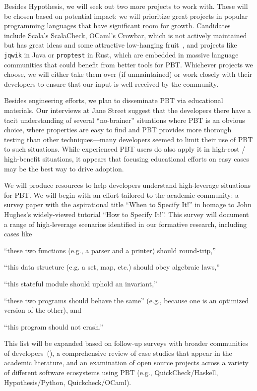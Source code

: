 Besides Hypothesis, we will seek out two more projects to work with. These
will be chosen based on potential impact: we will prioritize great
projects in popular programming languages that have significant room
for growth. Candidates include
Scala's ScalaCheck,
OCaml's Crowbar, which is not actively maintained but has great ideas and
some attractive low-hanging fruit~\cite{noauthor_shrinking_nodate}, and projects like
\lstinline{jqwik} in Java or \lstinline{proptest} in Rust, which are
embedded in massive language
communities that could benefit from better tools for PBT. Whichever
projects we choose, we will either take them over (if
unmaintained) or work closely with their
developers to ensure that our input is well received by the community.

%
Besides engineering efforts, we plan to disseminate PBT via
educational materials.
Our interviews at Jane Street suggest that the developers there
have a tacit
understanding of several ``no-brainer'' situations where PBT is an obvious
choice, where properties are easy to find and PBT provides
more thorough testing than other techniques---many developers
seemed to limit their use of PBT to such situations.
While experienced PBT users do also apply it in
high-cost / high-benefit situations, it appears that
focusing educational efforts on easy cases may be the best way to
drive adoption.

We will produce resources to help developers understand
high-leverage situations for PBT. We will begin with an effort
tailored to the academic community: a survey paper with the
aspirational title ``When to Specify It!'' in homage to John Hughes's
widely-viewed tutorial ``How to Specify It!''. This survey will
document a  range of high-leverage scenarios identified in our formative
research, including cases like
\begin{enumerate*}[label=(\arabic{enumi})]
\item ``these two functions (e.g., a parser and a printer) should round-trip,''
\item ``this data structure (e.g. a set, map, etc.) should obey algebraic laws,''
\item ``this stateful module should uphold an invariant,''
\item ``these two programs should behave the same'' (e.g., because one
is an optimized version of the other),
and
\item ``this program should not crash.''
\end{enumerate*}
This list will be expanded based on follow-up surveys with broader
communities of developers~(), a comprehensive
review of case studies that appear in
the academic literature, and an examination of open source projects across a
variety of different software ecosystems using PBT (e.g.,
QuickCheck/Haskell, Hypothesis/Python, Quickcheck/OCaml).

